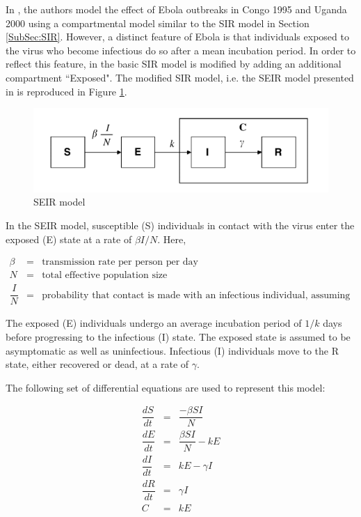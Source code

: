 \documentclass[10pt, journal,onecolumn]{IEEEtran}
\begin{document}
In \citep{chowell2004basic}, the authors model the effect of Ebola outbreaks in Congo 1995 and Uganda
2000 using a compartmental model similar to the SIR model in Section \ref{SubSec:SIR}. However, a
distinct feature of Ebola is that individuals exposed to the virus who become infectious do so
after a mean incubation period. In order to reflect this feature, in \citep{chowell2004basic} the
basic SIR model is modified by adding an additional compartment ``Exposed". The modified SIR model,
i.e. the SEIR model presented in \citep{chowell2004basic} is reproduced in
Figure \ref{fig:SEIR_model}.

\begin{figure}[h!]
\captionsetup{justification=centering}
\includegraphics[scale=0.5]{seir_model_fig}
\centering\caption{SEIR model}
\label{fig:SEIR_model}
\end{figure}

In the SEIR model, susceptible (S) individuals in contact with the virus enter the exposed (E) state at a rate of $\beta I / N$. Here,

\begin{eqnarray*}
\beta &=& \text{transmission rate per person per day}\\
N &=& \text{total effective population size}\\
\dfrac{I}{N} &=& \text{probability that contact is made with an infectious individual, assuming uniform random mixing}
\end{eqnarray*}

The exposed (E) individuals undergo an average incubation period of $1/k$ days before progressing to
the infectious (I) state. The exposed state is assumed to be asymptomatic as well as uninfectious.
Infectious (I) individuals move to the R state, either recovered or dead, at a rate of $\gamma$.

The following set of differential equations are used to represent this model:

\begin{eqnarray}
\label{Eq:SEIR}
\dfrac{dS}{dt}	&=&	\dfrac{-\beta SI}{N}\nonumber\\
\dfrac{dE}{dt}	&=&	\dfrac{\beta SI}{N}-kE\nonumber\\
\dfrac{dI}{dt}	&=&	kE-\gamma I\nonumber\\
\dfrac{dR}{dt}	&=&	\gamma I\nonumber\\
C	&=&	kE\nonumber\\
 \end{eqnarray}
\end{document}
